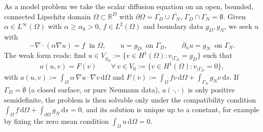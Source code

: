 \documentclass{article}
\newcommand{\R}{\mathbb{R}}
\theoremstyle{plain}
\numberwithin{equation}{section}
\begin{document}
As a model problem we take the scalar diffusion equation on an open, bounded,
connected Lipschitz domain $\Omega \subset \R^{D}$ with $\partial\Omega =
    \overline{\Gamma_D} \cup \overline{\Gamma_N}$, $\Gamma_D \cap \Gamma_N =
    \emptyset$. Given $\alpha \in L^\infty(\Omega)$ with $\alpha \ge \alpha_0 > 0$,
$f \in L^2(\Omega)$ and boundary data $g_D, g_N$, we seek $u$ with
\begin{equation}
    -\nabla \cdot (\alpha \nabla u) = f \ \text{ in } \Omega,
    \qquad u = g_D \ \text{ on } \Gamma_D,
    \qquad \partial_n u = g_N \ \text{ on } \Gamma_N.
    \label{eq:poisson-strong}
\end{equation}
The weak form reads: find $u \in V_{g_D} := \{ v \in H^1(\Omega) : v_{|\Gamma_D}
    = g_D \}$ such that
\begin{equation}
    a(u, v) = F(v) \qquad \forall\, v \in V_0 := \{ v \in H^1(\Omega) :
    v_{|\Gamma_D} = 0 \},
    \label{eq:weak-form}
\end{equation}
with $a(u, v) := \int_{\Omega} \alpha\, \nabla u \cdot \nabla v\,\mathrm{d}\Omega$
and $F(v) := \int_{\Omega} f v \,\mathrm{d}\Omega + \int_{\Gamma_N} g_N v
    \,\mathrm{d}s$. If $\Gamma_D = \emptyset$ (a closed surface, or pure Neumann
data), $a(\cdot,\cdot)$ is only positive semidefinite, the problem is then solvable only under the compatibility condition
$\int_\Omega f \,\mathrm{d}\Omega + \int_{\partial\Omega} g_N \,\mathrm{d}s = 0$,
and its solution is unique up to a constant, for example by fixing the zero mean condition $\int_\Omega u
    \,\mathrm{d}\Omega = 0$.
\end{document}
